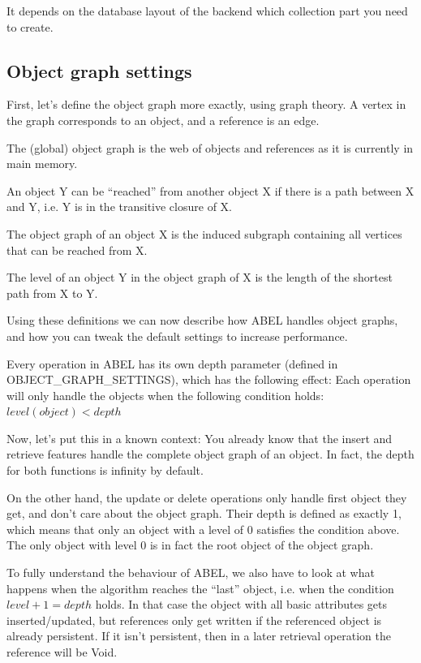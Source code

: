 It depends on the database layout of the backend which collection part you need to create.

\subsection{Object graph settings}

First, let's define the object graph more exactly, using graph theory.
A vertex in the graph corresponds to an object, and a reference is an edge.

The (global) object graph is the web of objects and references as it is currently in main memory.

An object Y can be ``reached'' from another object X if there is a path between X and Y, i.e. Y is in the transitive closure of X.

The object graph of an object X is the induced subgraph containing all vertices that can be reached from X.

The level of an object Y in the object graph of X is the length of the shortest path from X to Y.

Using these definitions we can now describe how ABEL handles object graphs, and how you can tweak the default settings to increase performance.

Every operation in ABEL has its own depth parameter (defined in OBJECT\_GRAPH\_SETTINGS), which has the following effect:
Each operation will only handle the objects when the following condition holds: $ level(object) < depth $

Now, let's put this in a known context:
You already know that the insert and retrieve features handle the complete object graph of an object. 
In fact, the depth for both functions is infinity by default.

On the other hand, the update or delete operations only handle first object they get, and don't care about the object graph.
Their depth is defined as exactly 1, which means that only an object with a level of 0 satisfies the condition above.
The only object with level 0 is in fact the root object of the object graph.

To fully understand the behaviour of ABEL, we also have to look at what happens when the algorithm reaches the ``last'' object, i.e. when the condition $level + 1 = depth$ holds.
In that case the object with all basic attributes gets inserted/updated, but references only get written if the referenced object is already persistent.
If it isn't persistent, then in a later retrieval operation the reference will be Void.

